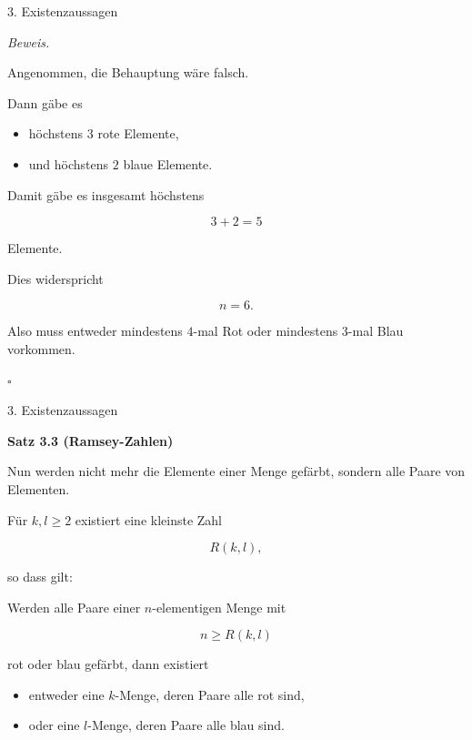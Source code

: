 \documentclass{beamer}
\begin{document}
\begin{frame}{3. Existenzaussagen}

\textit{Beweis.}

Angenommen, die Behauptung wäre falsch.

Dann gäbe es

\begin{itemize}
    \item höchstens \(3\) rote Elemente,
    \item und höchstens \(2\) blaue Elemente.
\end{itemize}

Damit gäbe es insgesamt höchstens

\[
3+2=5
\]

Elemente.

Dies widerspricht

\[
n=6.
\]

Also muss entweder mindestens \(4\)-mal Rot
oder mindestens \(3\)-mal Blau vorkommen.

\hfill $\square$

\end{frame}

\begin{frame}{3. Existenzaussagen}

\textbf{Satz 3.3 (Ramsey-Zahlen)}

Nun werden nicht mehr die Elemente einer Menge gefärbt,
sondern alle Paare von Elementen.

Für \(k,l\ge 2\) existiert eine kleinste Zahl

\[
R(k,l),
\]

so dass gilt:

Werden alle Paare einer \(n\)-elementigen Menge mit

\[
n \ge R(k,l)
\]

rot oder blau gefärbt, dann existiert

\begin{itemize}
\item entweder eine \(k\)-Menge, deren Paare alle rot sind,
\item oder eine \(l\)-Menge, deren Paare alle blau sind.
\end{itemize}

\end{frame}
\end{document}
